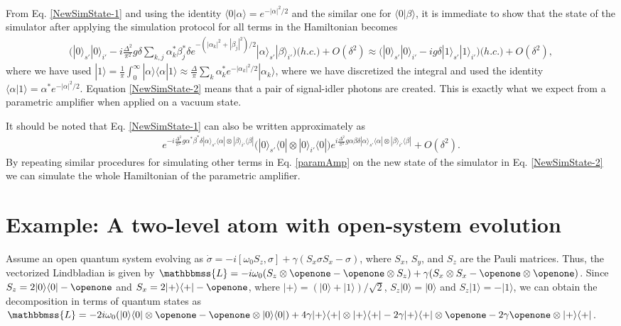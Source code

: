 \documentclass[aps,pra,twocolumn,floatfix,groupedaddress,superscriptaddress,nofootinbib,notitlepage]{revtex4-2}
\begin{document}
From Eq. \eqref{NewSimState-1} and using the identity $\langle 0|\alpha\rangle=e^{-|\alpha|^2/2}$ and the similar one for $\langle 0|\beta\rangle$, it is immediate to show that the state of the simulator after applying the simulation protocol for all terms in the Hamiltonian becomes
\begin{align}
\label{NewSimState-2}
\big( |0 \rangle_{s'} |0 \rangle_{i'}-i \frac{\Delta^{2}}{\pi^{2}}g \delta \textstyle{\sum_{k, j}} \alpha_k^{*}\beta_j^{*} \delta e^{-(|\alpha_k|^2+|\beta_j|^2)/2} |\alpha\rangle_{s'}|\beta\rangle_{i'}\big)\big(h.c.\big)+O(\delta^{2}) \approx \big( |0 \rangle_{s'} |0 \rangle_{i'}-i g \delta |1 \rangle_{s'} |1 \rangle_{i'}\big)\big(h.c.\big)+O(\delta^{2}),
\end{align}
where we have used $|1\rangle= \frac{1}{\pi} \int_0^{\infty}  |\alpha\rangle \langle\alpha |1\rangle \approx \frac{\Delta}{\pi}\textstyle{\sum_{k}} \alpha_k^{*} e^{-|\alpha_k|^2/2} |\alpha_k\rangle$, where we have discretized the integral and used the identity $\langle\alpha |1\rangle =\alpha^{*} e^{-|\alpha|^2/2}$. Equation \eqref{NewSimState-2} means that a pair of signal-idler photons are created. This is exactly what we expect from a parametric amplifier when applied on a vacuum state. 

It should be noted that Eq. \eqref{NewSimState-1} can also be written approximately as 
\begin{align}
e^{-i \frac{\Delta^{2}}{\pi^{2}} g \alpha^{*}\beta^{*} \delta |\alpha\rangle_{s'}\langle \alpha| \otimes |\beta \rangle_{i'}\langle \beta|}
\big(|0 \rangle_{s'}\langle 0|\otimes |0 \rangle_{i'}\langle 0|\big) e^{i \frac{\Delta^{2}}{\pi^{2}} g \alpha \beta \delta |\alpha\rangle_{s'}\langle \alpha| \otimes |\beta \rangle_{i'}\langle \beta|} + O(\delta^{2}).
\end{align}
By repeating similar procedures for simulating other terms in Eq. \eqref{paramAmp} on the new state of the simulator in Eq. \eqref{NewSimState-2} we can simulate the whole Hamiltonian of the parametric amplifier. 

\section{Example: A two-level atom with open-system evolution}
\label{app:opsys}

Assume an open quantum system evolving as $\dot{\sigma}=-i[\omega_{0} S_{z},\sigma]+\gamma (S_{x} \sigma S_{x}-\sigma)$, where $S_{x}$, $S_{y}$, and $S_{z}$ are the Pauli matrices. Thus, the vectorized Lindbladian is given by $\mathbbmss{L}=-i\omega_{0} (S_{z} \otimes \openone- \openone \otimes S_{z})+\gamma (S_{x} \otimes S_{x}-\openone\otimes \openone)$. Since $S_{z}=2 |0\rangle\langle 0|-\openone$ and $S_{x}=2 |+\rangle\langle +|-\openone$, where $ |+\rangle=( |0\rangle+ |1\rangle)/\sqrt{2}$, $S_{z} |0\rangle=|0\rangle$ and $S_{z} |1\rangle=-|1\rangle$, we can obtain the decomposition in terms of quantum states as  $\mathbbmss{L} = -2i\omega_{0} (|0\rangle\langle 0| \otimes \openone- \openone \otimes |0\rangle\langle 0|)+ 4\gamma |+\rangle\langle +|\otimes |+\rangle\langle +|- 2\gamma |+\rangle\langle +| \otimes \openone-2\gamma \openone \otimes |+\rangle\langle +|$. 
\end{document}
